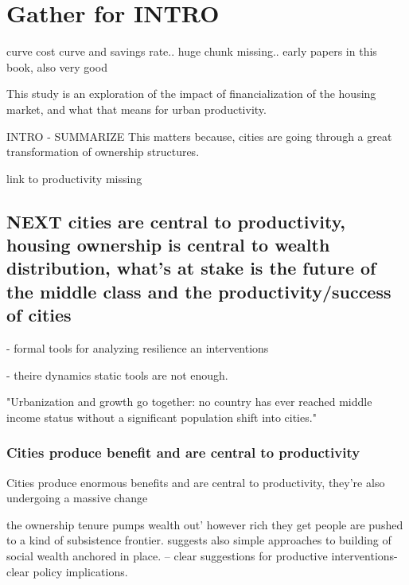 \chapter{Gather for INTRO}


\cite{spenceUrbanizationGrowth2009} 
curve cost curve and savings rate.. huge chunk missing..
early papers in this book, also very good


This study is an exploration of the impact of financialization of the housing market, and what that means for urban productivity.

INTRO - SUMMARIZE 
This matters because, %
cities are going through a great transformation of ownership structures. 

link to productivity missing


\section{NEXT cities are central to productivity, housing ownership is central to wealth distribution, what's at stake is the future of the middle class and the productivity/success of cities}
- formal tools for analyzing resilience an interventions

- theire dynamics static tools are not enough. 

"Urbanization and growth go together: no country has ever reached middle income status without a significant population shift into cities." \cite{annezUrbanizationGrowthSetting2009} %

\subsection{Cities produce benefit and are central to productivity}
Cities produce enormous benefits and are central to productivity, they're also undergoing a massive change

the ownership tenure pumps wealth out'
however rich they get people are pushed to a kind of subsistence frontier. 
suggests also simple approaches to building of social wealth anchored in place. -- clear suggestions for productive interventions- clear policy implications. 

